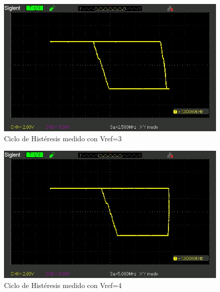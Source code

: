 \begin{figure}[H]
    \centering
    \includegraphics[width=0.75\linewidth]{Secciones/Circuito4/SDS00006.jpg}
    \caption{Ciclo de Histéresis medido con Vref=3}
    \label{fig:enter-label}
\end{figure}

\begin{figure}[H]
    \centering
    \includegraphics[width=0.75\linewidth]{Secciones/Circuito4/SDS00007.jpg}
    \caption{Ciclo de Histéresis medido con Vref=4}
    \label{fig:enter-label}
\end{figure}